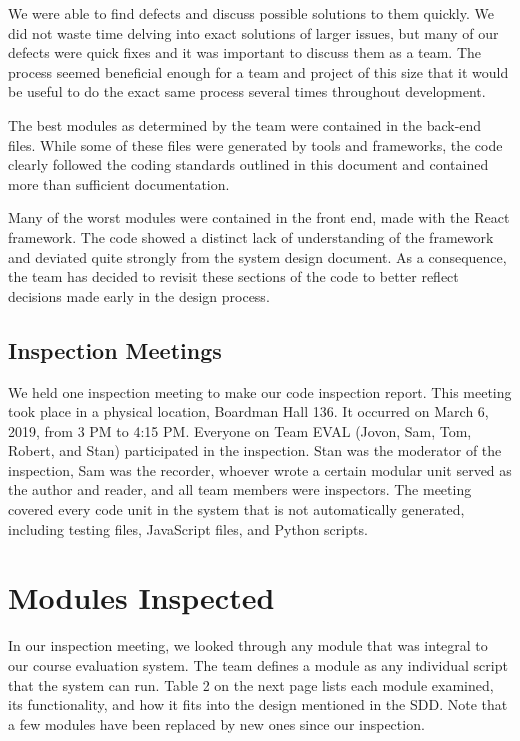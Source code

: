 \documentclass{article}
\begin{document}
We were able to find defects and discuss possible solutions to them quickly. We did not waste time delving into exact solutions of larger issues, but many of our defects were quick fixes and it was important to discuss them as a team. The process seemed beneficial enough for a team and project of this size that it would be useful to do the exact same process several times throughout development.

The best modules as determined by the team were contained in the back-end files. While some of these files were generated by tools and frameworks, the code clearly followed the coding standards outlined in this document and contained more than sufficient documentation. 

Many of the worst modules were contained in the front end, made with the React framework. The code showed a distinct lack of understanding of the framework and deviated quite strongly from the system design document. As a consequence, the team has decided to revisit these sections of the code to better reflect decisions made early in the design process. 

\subsection{Inspection Meetings}

We held one inspection meeting to make our code inspection report. This meeting took place in a physical location, Boardman Hall 136. It occurred on March 6, 2019, from 3 PM to 4:15 PM. Everyone on Team EVAL (Jovon, Sam, Tom, Robert, and Stan) participated in the inspection. Stan was the moderator of the inspection, Sam was the recorder, whoever wrote a certain modular unit served as the author and reader, and all team members were inspectors. The meeting covered every code unit in the system that is not automatically generated, including testing files, JavaScript files, and Python scripts.

\section{Modules Inspected}

In our inspection meeting, we looked through any module that was integral to our course evaluation system. The team defines a module as any individual script that the system can run. Table 2 on the next page lists each module examined, its functionality, and how it fits into the design mentioned in the SDD. Note that a few modules have been replaced by new ones since our inspection.
\end{document}

